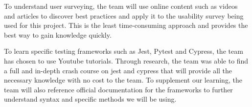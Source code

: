 \documentclass[12pt, titlepage]{article}
\begin{document}
To understand user surveying, the team will use online content such as videos and articles to discover best practices and apply it to the usability survey being used for this project. This is the least time-consuming approach and provides the best way to gain knowledge quickly. 

To learn specific testing frameworks such as Jest, Pytest and Cypress, the team has chosen to use Youtube tutorials. Through research, the team was able to find a full and in-depth crash course on jest and cypress that will provide all the necessary knowledge with no cost to the team. To supplement our learning, the team will also reference official documentation for the frameworks to further understand syntax and specific methods we will be using.
\end{document}
